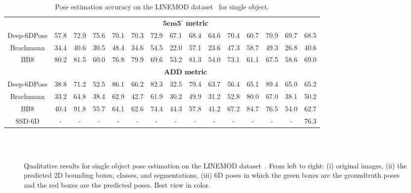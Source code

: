 \documentclass[conference]{IEEEtran}
\newcommand{\method}[1]{Deep-6DPose}
\begin{document}
\begin{table*}[!t]
\begin{center}
\begin{tabular}{c| c c c c c c c c c c c c c c}
   	\hline
   	   	   	&\multicolumn{14}{c}{$\mathbf{5cm5^\circ}$ \textbf{metric}} \\
\method{} &57.8 &72.9 &75.6 &70.1 &70.3 &72.9 &67.1 &68.4 &64.6 &70.4 &60.7 &70.9 &69.7 &68.5\\ 
Brachmann\cite{CVPR16} &34.4 &40.6 &30.5 &48.4 &34.6 &54.5 &22.0 &57.1 &23.6 &47.3 &58.7 &49.3 &26.8 &40.6\\
BB8\cite{BB8} &80.2 &81.5 &60.0 &76.8 &79.9 &69.6 &53.2 &81.3 &54.0 &73.1 &61.1 &67.5 &58.6 &69.0\\
   	\hline   	
   	   	&\multicolumn{14}{c}{$\mathbf{ADD}$ \textbf{metric}} \\
\method{} &38.8 &71.2 &52.5 &86.1 &66.2 &82.3 &32.5 &79.4 &63.7 &56.4 &65.1 &89.4 &65.0 &65.2\\ 
Brachmann\cite{CVPR16}  &33.2 &64.8 &38.4 &62.9 &42.7 &61.9 &30.2 &49.9 &31.2 &52.8 &80.0 &67.0 &38.1 &50.2\\
BB8\cite{BB8} &40.4 &91.8 &55.7 &64.1 &62.6 &74.4 &44.3 &57.8 &41.2 &67.2 &84.7 &76.5 &54.0 &62.7\\
SSD-6D\cite{SSD-6D} &- &- &- &- &- &- &- &- &- &- &- &- &- &76.3\\
   	\hline   	
    \end{tabular}
    \end{center}
   \vspace{-0.2cm}
    \caption{Pose estimation accuracy on the LINEMOD dataset~\cite{ACCV12} for single object.}
    \label{tab:pose} 
\end{table*}\begin{figure*}[!t]
\vspace{0.1cm}
\centering
{}
\\
\vspace{0.1cm}
\\
\vspace{0.1cm}
\caption[]{Qualitative results for single object pose estimation on the LINEMOD dataset~\cite{ACCV12}. From left to right: (i) original images, (ii) the predicted 2D bounding boxes, classes, and segmentations, (iii) 6D poses in which the green boxes are the groundtruth poses and the red boxes are the predicted poses. Best view in color.}
\label{fig:singleobj}
\vspace{-0.3cm}
\end{figure*}
\end{document}
